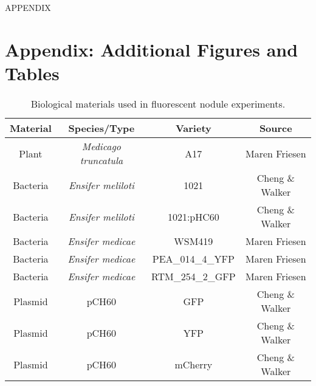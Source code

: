 \documentclass[12pt]{article}
\begin{document}
\begin{doublespace}
\newpage
\section*{} %
\begin{center}
	\vfill
	APPENDIX
	\vfill
\end{center}

\newpage
\section*{\large{Appendix: Additional Figures and Tables}}

\begin{table}[H]
	\centering
	
	\label{biomat}
		\caption{Biological materials used in fluorescent nodule experiments.}
	\begin{tabular}{@{}cccc@{}}
		\toprule
		\textbf{Material} & \textbf{Species/Type} & \textbf{Variety} & \textbf{Source} \\ \midrule
		Plant             & \textit{Medicago truncatula}   & A17              & Maren Friesen   \\
		Bacteria          & \textit{Ensifer meliloti}      & 1021             & Cheng \& Walker \\
		Bacteria          & \textit{Ensifer meliloti}      & 1021:pHC60       & Cheng \& Walker \\
		Bacteria          & \textit{Ensifer medicae}       & WSM419           & Maren Friesen   \\
		Bacteria          & \textit{Ensifer medicae}       & PEA\_014\_4\_YFP & Maren Friesen   \\
		Bacteria          & \textit{Ensifer medicae}       & RTM\_254\_2\_GFP & Maren Friesen   \\
		Plasmid           & pCH60                 & GFP              & Cheng \& Walker \\
		Plasmid           & pCH60                 & YFP              & Cheng \& Walker \\
		Plasmid           & pCH60                 & mCherry          & Cheng \& Walker \\ \bottomrule
	\end{tabular}

\end{table}



\end{doublespace}
\end{document}
